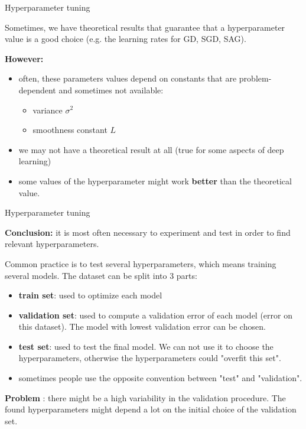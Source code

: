 \documentclass[usenames,dvipsnames,french]{beamer}
\begin{document}
\begin{frame}{Hyperparameter tuning}

    Sometimes, we have theoretical results that guarantee that a hyperparameter
    value is a good choice (e.g. the learning rates for GD, SGD, SAG).

    \textbf{{However:}} 
    \begin{itemize}
        \item often, these parameters values depend on constants that are
            problem-dependent and sometimes not available:
            \begin{itemize}
                \item variance $ \sigma^2$
                \item smoothness constant $L$
            \end{itemize}
        \item we may not have a theoretical result at all (true for some
            aspects of deep learning)
        \item some values of the hyperparameter might work \textbf{{better}}
            than the theoretical value.
    \end{itemize}
\end{frame}

\begin{frame}{Hyperparameter tuning}

    \textbf{{Conclusion: }} it is most often necessary to experiment and test in order to find
    relevant hyperparameters.
    
\end{frame}

\begin{frame}
    Common practice is to  test several hyperparameters, which means training several models. 
    The dataset can be split into 3 parts:

    \begin{itemize}
        \item \textbf{train set}: used to optimize each model
        \item \textbf{validation set}: used to compute a validation error of each model
            (error on this dataset). The model with lowest validation error can
            be chosen.
        \item \textbf{test set}: used to test the final model. We can not use it to
            choose the hyperparameters, otherwise the hyperparameters could "overfit this set".
	\item sometimes people use the opposite convention between "test" and "validation".
    \end{itemize}

    \textbf{{Problem}} : there might be a high variability in the validation
    procedure. The found hyperparameters might depend a lot on the initial
    choice of the validation set.
    
\end{frame}
\end{document}
